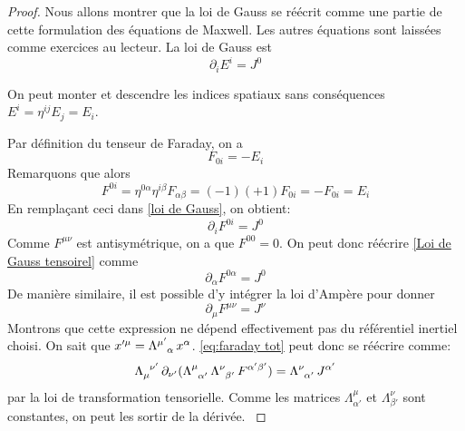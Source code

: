 \begin{proof}
    Nous allons montrer que la loi de Gauss se réécrit comme une partie de cette formulation des équations de Maxwell. Les autres équations sont laissées comme exercices au lecteur. La loi de Gauss est
    \begin{equation}
        \partial_{i}E^{i} = J^{0}
        \label{loi de Gauss}
    \end{equation}
    \begin{rmk}
        On peut monter et descendre les indices spatiaux sans conséquences $E^{i} = \eta^{ij}E_{j} = E_{i}$.
    \end{rmk}
    Par définition du tenseur de Faraday, on a
    \begin{equation}
        F_{0i} = -E_i
    \end{equation}
    Remarquons que alors
    \begin{equation}
        F^{0i} = \eta ^{0 \alpha} \eta ^{i\beta} F_{\alpha \beta} = (-1)(+1)F_{0i} = -F_{0i} = E_i
        \label{Faraday}
    \end{equation}
    En remplaçant ceci dans \ref{loi de Gauss}, on obtient:
    \begin{equation}
        \partial_{i}F^{0i} = J^0
        \label{Loi de Gauss tensoirel}
    \end{equation}
    Comme $F^{\mu \nu}$ est antisymétrique, on a que $F^{00} = 0$. On peut donc réécrire \ref{Loi de Gauss tensoirel} comme
    \begin{equation}
        \partial_{\alpha}F^{0\alpha} = J^0
    \end{equation}
    De manière similaire, il est possible d'y intégrer la loi d'Ampère pour donner
    \begin{equation}
        \label{eq:faraday tot}
        \partial_{\mu}F^{\mu\nu} = J^{\nu}
    \end{equation}
    \cutebreak
    {
    \renewcommand\indexmarker{\cdot}
    Montrons que cette expression ne dépend effectivement pas du référentiel inertiel choisi. On sait que $x'^{\mu} = \Lambda\indices{^{\mu'}_{\alpha}}\,x^{\alpha}$. \ref{eq:faraday tot} peut donc se réécrire comme:
    \begin{equation}
        \Lambda\indices{_{\mu}^{\nu '}}\, \partial_{\nu '}(\Lambda\indices{^{\mu}_{\alpha'}}\,\Lambda\indices{^{\nu}_{\beta '}}\,F^{\alpha ' \beta '} ) =  \Lambda\indices{^{\nu }_{\alpha'}}\, J^{\alpha '}
    \end{equation}
    par la loi de transformation tensorielle. Comme les matrices $\Lambda ^{\mu}_{\alpha'}$ et $\Lambda ^{\nu}_{\beta '}$ sont constantes, on peut les sortir de la dérivée. 
}
\end{proof}
